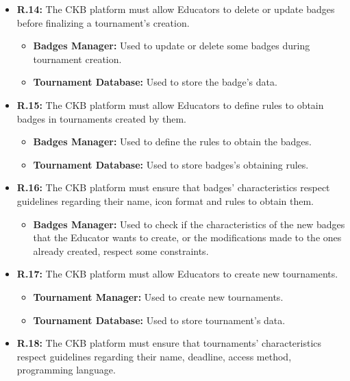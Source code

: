 \documentclass{article}
\begin{document}
{\begin{itemize}
\begin{itemize}
          \end{itemize}
    \item \textbf{R.14:} The CKB platform must allow Educators to delete or update badges before finalizing a tournament's creation.
          \begin{itemize}
              \item \textbf{Badges Manager:} Used to update or delete some badges during tournament creation.
              \item \textbf{Tournament Database:}  Used to store the badge's data.
          \end{itemize}
    \item \textbf{R.15:} The CKB platform must allow Educators to define rules to obtain badges in tournaments created by them.
          \begin{itemize}
              \item \textbf{Badges Manager:} Used to define the rules to obtain the badges.
              \item \textbf{Tournament Database:} Used to store badges's obtaining rules.
          \end{itemize}
    \item \textbf{R.16:} The CKB platform must ensure that badges' characteristics respect guidelines regarding their
          name, icon format and rules to obtain them.
          \begin{itemize}
              \item \textbf{Badges Manager:} Used to check if the characteristics of the new badges
              that the Educator wants to create, or the modifications made to the ones already 
              created, respect some constraints.
          \end{itemize}
    \item \textbf{R.17:} The CKB platform must allow Educators to create new tournaments.
          \begin{itemize}
              \item \textbf{Tournament Manager:} Used to create new tournaments.
              \item \textbf{Tournament Database:} Used to store tournament's data.
          \end{itemize}
    \item \textbf{R.18:} The CKB platform must ensure that tournaments' characteristics respect guidelines regarding their
          name, deadline, access method, programming language.
          \begin{itemize}

\end{itemize}
\end{itemize}}
\end{document}
